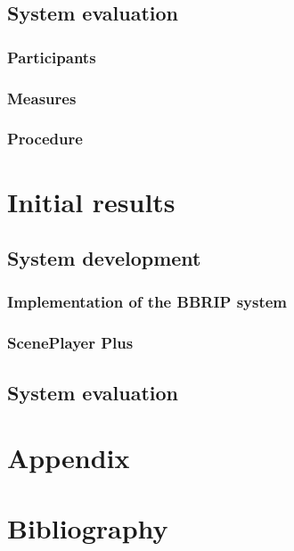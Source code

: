 \documentclass[a4paper,11pt]{article}
\begin{document}
\subsection{System evaluation}


\subsubsection{Participants}

\subsubsection{Measures}

\subsubsection{Procedure}

\section{Initial results}

\subsection{System development}

\subsubsection{Implementation of the BBRIP system}

\subsubsection{ScenePlayer Plus}

\subsection{System evaluation}


\section{Appendix}


\section{Bibliography}
\end{document}
